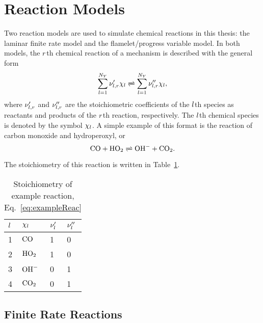 \section{Reaction Models}

Two reaction models are used to simulate chemical reactions in this thesis: the laminar finite rate model and the flamelet/progress variable model. In both models, the $r$th chemical reaction of a mechanism is described with the general form
%
\begin{equation}
	\specSumAll \stoichCoefSpecReac' \chi_{\specIdx} \xrightleftharpoons[]{} \specSumAll \stoichCoefSpecReac'' \chi_{\specIdx},
\end{equation}
%
where $\nu_{l,r}'$ and $\nu_{l,r}''$ are the stoichiometric coefficients of the $l$th species as reactants and products of the $r$th reaction, respectively. The $l$th chemical species is denoted by the symbol $\chi_{l}$. A simple example of this format is the reaction of carbon monoxide and hydroperoxyl, or
%
\begin{equation}\label{eq:exampleReac}
	\carbonmonox + \hydroperoxyl \xrightleftharpoons[]{} \hydroxide + \carbondiox.
\end{equation}
%
The stoichiometry of this reaction is written in Table~\ref{tab:exampleReac}.

\begin{table}
	\centering
	\setlength{\tabcolsep}{12pt}
	\begin{tabular}{llll}
		\toprule
		$l$ & $\chi_{l}$ & $\nu_{l}'$ & $\nu_{l}''$ \\
		\midrule
		1 & $\text{CO}$ & 1 & 0 \\
		2 & $\text{HO}_2$ & 1 & 0 \\
		3 & $\text{OH}^{-}$ & 0 & 1 \\
		4 & $\text{CO}_2$ & 0 & 1 \\
		\bottomrule
	\end{tabular}
	\caption{\label{tab:exampleReac}Stoichiometry of example reaction, Eq.~\ref{eq:exampleReac}}
\end{table}

\subsection{Finite Rate Reactions}\label{sec:finiterate}

